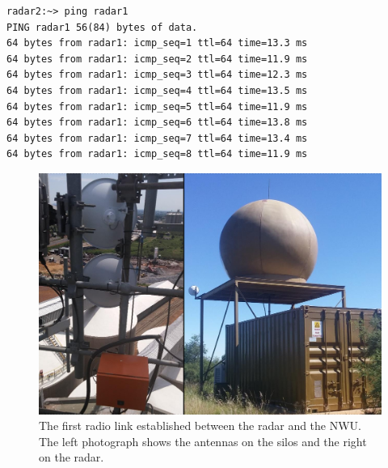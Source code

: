 \documentclass{wrcreport}
\begin{document}
\begin{verbatim}
radar2:~> ping radar1
PING radar1 56(84) bytes of data.
64 bytes from radar1: icmp_seq=1 ttl=64 time=13.3 ms
64 bytes from radar1: icmp_seq=2 ttl=64 time=11.9 ms
64 bytes from radar1: icmp_seq=3 ttl=64 time=12.3 ms
64 bytes from radar1: icmp_seq=4 ttl=64 time=13.5 ms
64 bytes from radar1: icmp_seq=5 ttl=64 time=11.9 ms
64 bytes from radar1: icmp_seq=6 ttl=64 time=13.8 ms
64 bytes from radar1: icmp_seq=7 ttl=64 time=13.4 ms
64 bytes from radar1: icmp_seq=8 ttl=64 time=11.9 ms
\end{verbatim}

\begin{figure}[!htp]
\includegraphics[width=\textwidth]{comlink1.jpg} \caption[The first
radio link established between the radar and the NWU.]{The first radio
link established between the radar and the NWU. The left photograph
shows the antennas on the silos and the right on the radar.}
\label{fig:link1}
\end{figure}
\end{document}
